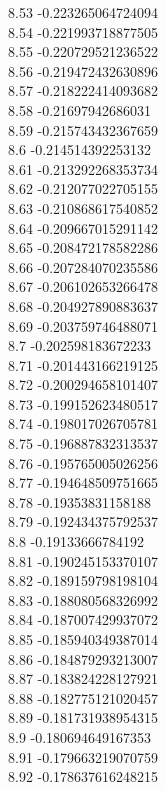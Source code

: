 {8.53	-0.223265064724094\\
8.54	-0.221993718877505\\
8.55	-0.220729521236522\\
8.56	-0.219472432630896\\
8.57	-0.218222414093682\\
8.58	-0.21697942686031\\
8.59	-0.215743432367659\\
8.6	-0.214514392253132\\
8.61	-0.213292268353734\\
8.62	-0.212077022705155\\
8.63	-0.210868617540852\\
8.64	-0.209667015291142\\
8.65	-0.208472178582286\\
8.66	-0.207284070235586\\
8.67	-0.206102653266478\\
8.68	-0.204927890883637\\
8.69	-0.203759746488071\\
8.7	-0.202598183672233\\
8.71	-0.201443166219125\\
8.72	-0.200294658101407\\
8.73	-0.199152623480517\\
8.74	-0.198017026705781\\
8.75	-0.196887832313537\\
8.76	-0.195765005026256\\
8.77	-0.194648509751665\\
8.78	-0.19353831158188\\
8.79	-0.192434375792537\\
8.8	-0.19133666784192\\
8.81	-0.190245153370107\\
8.82	-0.189159798198104\\
8.83	-0.188080568326992\\
8.84	-0.187007429937072\\
8.85	-0.185940349387014\\
8.86	-0.184879293213007\\
8.87	-0.183824228127921\\
8.88	-0.182775121020457\\
8.89	-0.181731938954315\\
8.9	-0.180694649167353\\
8.91	-0.179663219070759\\
8.92	-0.178637616248215\\
}
